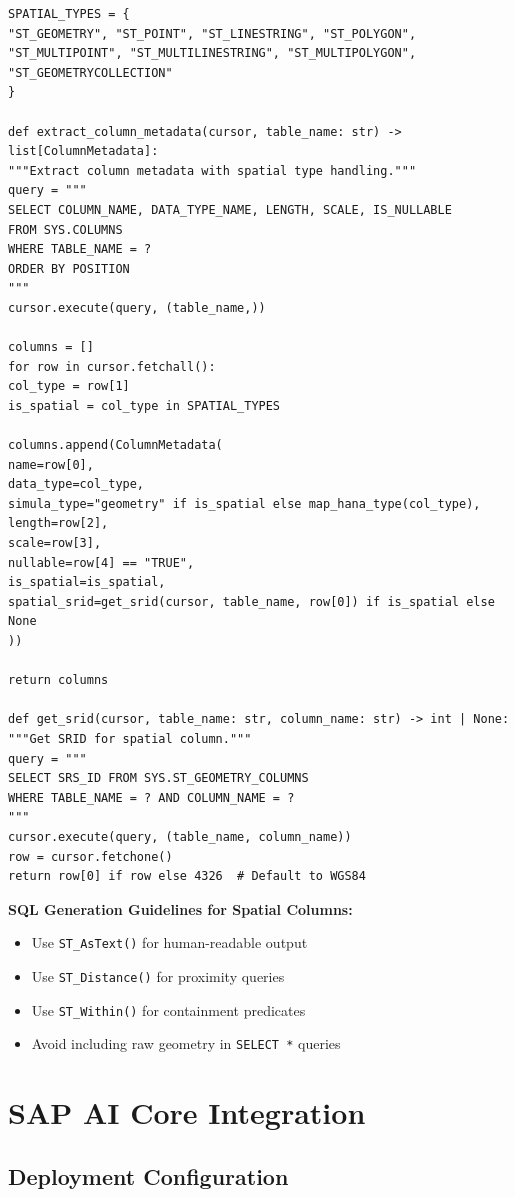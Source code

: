 \documentclass[12pt,a4paper,twoside]{report}
\begin{document}
\begin{lstlisting}[language=jsonx,caption={Spatial type detection and handling}]
SPATIAL_TYPES = {
"ST_GEOMETRY", "ST_POINT", "ST_LINESTRING", "ST_POLYGON",
"ST_MULTIPOINT", "ST_MULTILINESTRING", "ST_MULTIPOLYGON",
"ST_GEOMETRYCOLLECTION"
}

def extract_column_metadata(cursor, table_name: str) -> list[ColumnMetadata]:
"""Extract column metadata with spatial type handling."""
query = """
SELECT COLUMN_NAME, DATA_TYPE_NAME, LENGTH, SCALE, IS_NULLABLE
FROM SYS.COLUMNS
WHERE TABLE_NAME = ?
ORDER BY POSITION
"""
cursor.execute(query, (table_name,))

columns = []
for row in cursor.fetchall():
col_type = row[1]
is_spatial = col_type in SPATIAL_TYPES

columns.append(ColumnMetadata(
name=row[0],
data_type=col_type,
simula_type="geometry" if is_spatial else map_hana_type(col_type),
length=row[2],
scale=row[3],
nullable=row[4] == "TRUE",
is_spatial=is_spatial,
spatial_srid=get_srid(cursor, table_name, row[0]) if is_spatial else None
))

return columns

def get_srid(cursor, table_name: str, column_name: str) -> int | None:
"""Get SRID for spatial column."""
query = """
SELECT SRS_ID FROM SYS.ST_GEOMETRY_COLUMNS
WHERE TABLE_NAME = ? AND COLUMN_NAME = ?
"""
cursor.execute(query, (table_name, column_name))
row = cursor.fetchone()
return row[0] if row else 4326  # Default to WGS84
\end{lstlisting}

\textbf{SQL Generation Guidelines for Spatial Columns:}
\begin{itemize}
\item Use \texttt{ST\_AsText()} for human-readable output
\item Use \texttt{ST\_Distance()} for proximity queries
\item Use \texttt{ST\_Within()} for containment predicates
\item Avoid including raw geometry in \texttt{SELECT *} queries
\end{itemize}


\section{SAP AI Core Integration}

\subsection{Deployment Configuration}
\end{document}
